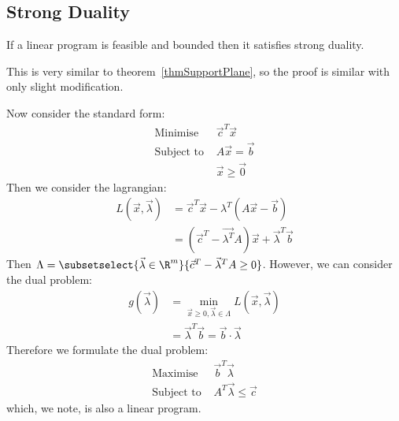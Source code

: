 \documentclass[../Main.tex]{subfiles}
\begin{document}
\subsection{Strong Duality}
\begin{theorem}
    If a linear program is feasible and bounded then it satisfies strong duality.
    \label{thmLinearProgStrongDual}
\end{theorem}
\begin{remark}
    This is very similar to theorem~\ref{thmSupportPlane}, so the proof is similar with only slight modification.
\end{remark}
Now consider the standard form:
\begin{align*}
    \text{Minimise } &\vec{c}^T \vec{x} \\
    \text{Subject to } &A\vec{x} = \vec{b} \\
    &\vec{x} \geq \vec{0}
\end{align*}
Then we consider the lagrangian:
\begin{align*}
    L(\vec{x}, \vec{\lambda}) &= \vec{c}^T \vec{x} - \lambda^T (A\vec{x} - \vec{b}) \\
    &= (\vec{c}^T - \vec{\lambda^T} A)\vec{x} + \vec{\lambda}^T \vec{b}
\end{align*}
Then $\Lambda = \subsetselect{\vec{\lambda} \in \R^m}{\vec{c}^T - \vec{\lambda}^T A \geq 0}$. However, we can consider the dual problem:
\begin{align*}
    g(\vec{\lambda}) &= \min_{\vec{x} \geq 0, \vec{\lambda} \in \Lambda} L(\vec{x}, \vec{\lambda}) \\
    &= \vec{\lambda}^T \vec{b} = \vec{b} \cdot \vec{\lambda}
\end{align*}
Therefore we formulate the dual problem:
\begin{align*}
    \text{Maximise } &\vec{b}^T \vec{\lambda} \\
    \text{Subject to } &A^T \vec{\lambda} \leq \vec{c}
\end{align*}
which, we note, is also a linear program.
\end{document}
